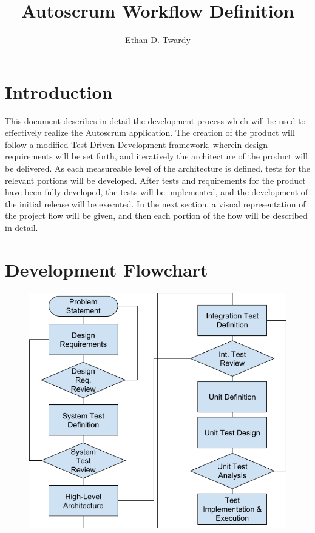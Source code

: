 \documentclass[12pt]{article}
\title{Autoscrum Workflow Definition}
\author{Ethan D. Twardy}
\begin{document}
\doublespacing

\maketitle
\pagebreak

\tableofcontents

\section{Introduction}
This document describes in detail the development process which will be used to
effectively realize the Autoscrum application. The creation of the product will
follow a modified Test-Driven Development framework, wherein design
requirements will be set forth, and iteratively the architecture of the product
will be delivered. As each measureable level of the architecture is defined,
tests for the relevant portions will be developed. After tests and requirements
for the product have been fully developed, the tests will be implemented, and
the development of the initial release will be executed. In the next section,
a visual representation of the project flow will be given, and then each
portion of the flow will be described in detail.
\pagebreak

\section{Development Flowchart}
\begin{figure}[hb]
  \includegraphics[width=\textwidth]{assets/designflow.png}
\end{figure}
\pagebreak
\end{document}
